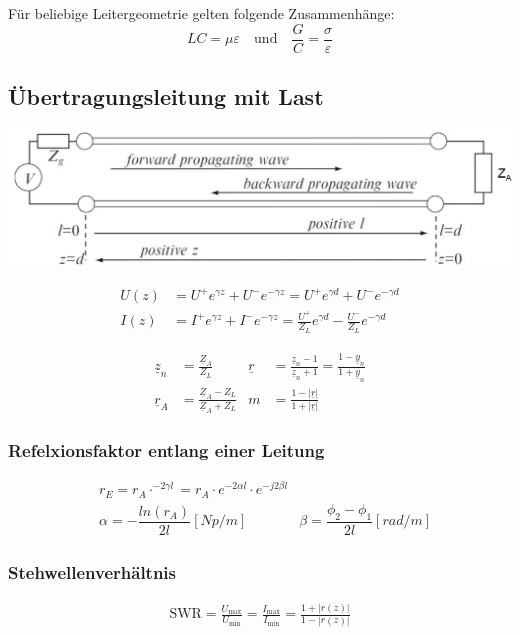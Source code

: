 Für beliebige Leitergeometrie gelten folgende Zusammenhänge:
\[
    LC = \mu\varepsilon \quad \text{und} \quad \frac{G}{C} = \frac{\sigma}{\varepsilon}
\]

\subsection{Übertragungsleitung mit Last}

\includegraphics[width=\columnwidth]{Figures/UebertragungleitungmitLast.png}

\begin{align*}
    U(z) & = U^+ e^{\gamma z} + U^- e^{-\gamma z} = U^+ e^{\gamma d} + U^ - e^{-\gamma d}                      \\
    I(z) & = I^+ e^{\gamma z} + I^- e^{-\gamma z} = \frac{U^+}{Z_L}e^{\gamma d} - \frac{U^-}{Z_L}e^{-\gamma d}
\end{align*}

\begin{align*}
    \underline{z}_n & = \frac{\underline{Z}_A}{Z_L}                     & \underline{r} & = \frac{\underline{z}_n-1}{\underline{z}_n+1}= \frac{1-\underline{y}_n}{1+\underline{y}_n} \\
    \underline{r}_A & = \frac{\underline{Z}_A-Z_L}{\underline{Z}_A+Z_L} & m             & = \frac{1-|\underline{r}|}{1+|\underline{r}|}
\end{align*}
\subsubsection{Refelxionsfaktor entlang einer Leitung}
\begin{align*}
    &r_E = r_A \cdot ^{-2\gamma l} = r_A \cdot e^{-2\alpha l}\cdot e^{-j2\beta l}\\
    &\alpha = -\dfrac{ln(r_A)}{2l} [Np/m]
    &\beta = \dfrac{\phi_2 -\phi_1}{2l} [rad/m]
\end{align*}

\subsubsection{Stehwellenverhältnis}
\begin{align*}
    \mathrm{SWR} = \frac{U_\text{max}}{U_\text{min}} =
    \frac{I_\text{max}}{I_\text{min}} = \frac{1+|r(z)|}{1-|r(z)|}
\end{align*}
